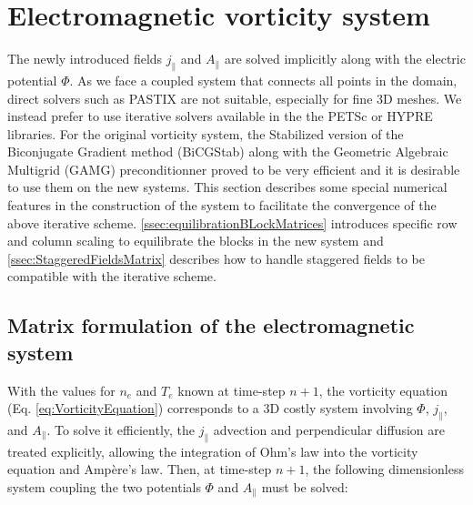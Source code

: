 \section{Electromagnetic vorticity system}


The newly introduced fields $j_\parallel$ and $A_\parallel$ are solved implicitly along with the electric potential $\Phi$. As we face a coupled system that connects all points in the domain, direct solvers such as PASTIX are not suitable, especially for fine 3D meshes. We instead prefer to use iterative solvers available in the the PETSc or HYPRE libraries. For the original vorticity system, the Stabilized version of the Biconjugate Gradient method (BiCGStab) along with the Geometric Algebraic Multigrid (GAMG) preconditionner proved to be very efficient and it is desirable to use them on the new systems. This section describes some special numerical features in the construction of the system to facilitate the convergence of the above iterative scheme. \autoref{ssec:equilibrationBLockMatrices} introduces specific row and column scaling to equilibrate the blocks in the new system and \autoref{ssec:StaggeredFieldsMatrix} describes how to handle staggered fields to be compatible with the iterative scheme.

\subsection{Matrix formulation of the electromagnetic system}

With the values for $n_e$ and $T_e$ known at time-step $n+1$, the vorticity equation (Eq. \ref{eq:VorticityEquation}) corresponds to a 3D costly system involving $\Phi$, $j_\parallel$, and $A_\parallel$. To solve it efficiently, the $j_\parallel$ advection and perpendicular diffusion are treated explicitly, allowing the integration of Ohm's law into the vorticity equation and Ampère's law. Then, at time-step $n+1$, the following dimensionless system coupling the two potentials $\Phi$ and $A_\parallel$ must be solved: \newline

